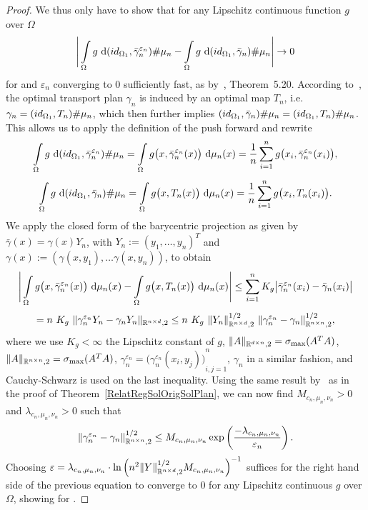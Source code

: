 \begin{proof}
	We thus only have to show that for any Lipschitz continuous function $g$ over $\Omega$
	\[ \Bigg\lvert \int\limits_{\Omega} g~\D[{\push[(id_{\Omega_1}, \bar{\gamma}_n^{\varepsilon_n})]{\mu_n}}] - \int\limits_{\Omega} g~\D[{\push[(id_{\Omega_1}, \bar{\gamma}_n)]{\mu_n}}] \Bigg\rvert \rightarrow 0 \]
	for \Ninf{} and $\varepsilon_n$ converging to $0$ sufficiently fast, as  by~\cite{Vill2009}, Theorem~5.20. According to~\cite{Seg2018}, the optimal transport plan $\gamma_n$ is induced by an optimal map $T_n$, i.e.~$\gamma_n = \push[(id_{\Omega_1}, T_n)]{\mu_n}$, which then further implies $\push[(id_{\Omega_1}, \bar{\gamma}_n)]{\mu_n} = \push[(id_{\Omega_1}, T_n)]{\mu_n}$. This allows us to apply the definition of the push forward and rewrite
	\[ \int\limits_{\Omega} g~\D[{\push[(id_{\Omega_1}, \bar{\gamma}_n^{\varepsilon_n})]{\mu_n}}] = \int\limits_{\Omega} g\big( x, \bar{\gamma}_n^{\varepsilon_n}(x) \big)~\Dx{\mu_n} = \frac{1}{n} \sum\limits_{i = 1}^n g\big( x_i, \bar{\gamma}_n^{\varepsilon_n}(x_i) \big), \]
	\[ \int\limits_{\Omega} g~\D[{\push[(id_{\Omega_1}, \bar{\gamma}_n)]{\mu_n}}] = \int\limits_{\Omega} g\big( x, T_n(x) \big)~\Dx{\mu_n} = \frac{1}{n} \sum\limits_{i = 1}^n g\big( x_i, T_n(x_i) \big). \]
	We apply the closed form of the barycentric projection as given by~\cite{Seg2018} $\bar{\gamma}(x) = \gamma(x) Y_n$, with $Y_n := {(y_1, \dots, y_n)}^T$ and $\gamma(x) := (\gamma(x, y_1), \dots \gamma(x, y_n))$, to obtain
	\[ \Bigg\lvert \int\limits_{\Omega} g\big( x, \bar{\gamma}_n^{\varepsilon_n}(x) \big)~\Dx{\mu_n} - \int\limits_{\Omega} g\big( x, T_n(x) \big)~\Dx{\mu_n} \Bigg\rvert \le \sum\limits_{i = 1}^n K_g \big\vert \bar{\gamma}_n^{\varepsilon_n}(x_i) - \bar{\gamma}_n(x_i) \big\vert \]
	\[ = n~K_g~\Vert \gamma_n^{\varepsilon_n} Y_n - \gamma_n Y_n \Vert_{\R^{n \times d}, 2} \le n~K_g~\Vert Y_n \Vert_{\R^{n \times d}, 2}^{1/2}~\Vert \gamma_n^{\varepsilon_n} - \gamma_n \Vert^{1/2}_{\R^{n \times n}, 2}, \]
	where we use $K_g < \infty$ the Lipschitz constant of $g$, $\Vert A \Vert_{\R^{d \times n}, 2} = \sigma_{\max}(A^T A)$, $\Vert A \Vert_{\R^{n \times n}, 2} = \sigma_{\max}(A^T A)$, $\gamma_n^{\varepsilon_n} = {\big( \gamma_n^{\varepsilon_n}(x_i, y_j) \big)}_{i, j = 1}^n$, $\gamma_n$ in a similar fashion, and Cauchy-Schwarz is used on the last inequality. Using the same result by~\cite{Comi1994} as in the proof of Theorem~\ref{RelatRegSolOrigSolPlan}, we can now find $M_{c_n, \mu_n, \nu_n} > 0$ and $\lambda_{c_n, \mu_n, \nu_n} > 0$ such that
	\[ \Vert \gamma_n^{\varepsilon_n} - \gamma_n \Vert^{1/2}_{\R^{n \times n}, 2} \le M_{c_n, \mu_n, \nu_n} \exp\left( \frac{-\lambda_{c_n, \mu_n, \nu_n}}{\varepsilon_n} \right). \]
	Choosing $\varepsilon = \lambda_{c_n, \mu_n, \nu_n} \cdot {\ln\left( n^2 \Vert Y \Vert^{1/2}_{\R^{n \times d}, 2} M_{c_n, \mu_n, \nu_n} \right)}^{-1}$ suffices for the right hand side of the previous equation to converge to $0$ for any Lipschitz continuous $g$ over $\Omega$, showing  for \Ninf.
\end{proof}

